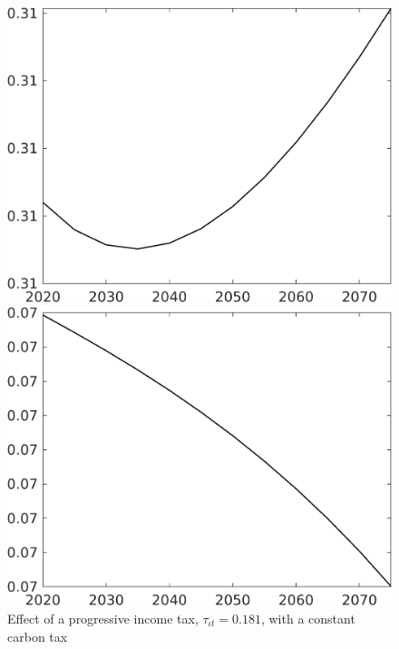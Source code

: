 \begin{figure}[h!!]
	\centering
	\caption{Effect of a progressive income tax, $\tau_{\iota t}=0.181$, with a constant carbon tax}		\label{fig:Efftaul_nsk0_xgr0_know_app}		
	\begin{minipage}[]{0.32\textwidth}
		\includegraphics[width=1\textwidth]{../../codding_model/own_basedOnFried/optimalPol_010922_revision/figures/all_13Sept22/CompTaufPER_bytaul_Reg0_sff_spillover0_nsk0_xgr0_knspil0_sep0_LFlimit0_emsbase0_countec0_GovRev0_etaa0.79_lgd0.png}
	\end{minipage}	
	\begin{minipage}[]{0.32\textwidth}
		\includegraphics[width=1\textwidth]{../../codding_model/own_basedOnFried/optimalPol_010922_revision/figures/all_13Sept22/CompTaufPER_bytaul_Reg0_sg_spillover0_nsk0_xgr0_knspil0_sep0_LFlimit0_emsbase0_countec0_GovRev0_etaa0.79_lgd0.png}

\end{minipage}
\end{figure}

